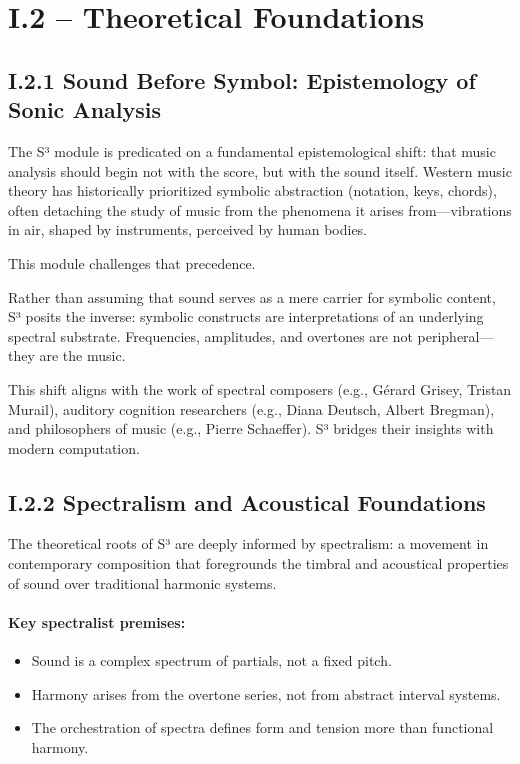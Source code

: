 \section*{I.2 – Theoretical Foundations}

\subsection*{I.2.1 Sound Before Symbol: Epistemology of Sonic Analysis}

The S³ module is predicated on a fundamental epistemological shift: that music analysis should begin not with the score, but with the sound itself. Western music theory has historically prioritized symbolic abstraction (notation, keys, chords), often detaching the study of music from the phenomena it arises from—vibrations in air, shaped by instruments, perceived by human bodies.

This module challenges that precedence.

Rather than assuming that sound serves as a mere carrier for symbolic content, S³ posits the inverse: symbolic constructs are interpretations of an underlying spectral substrate. Frequencies, amplitudes, and overtones are not peripheral—they are the music.

This shift aligns with the work of spectral composers (e.g., Gérard Grisey, Tristan Murail), auditory cognition researchers (e.g., Diana Deutsch, Albert Bregman), and philosophers of music (e.g., Pierre Schaeffer). S³ bridges their insights with modern computation.

\subsection*{I.2.2 Spectralism and Acoustical Foundations}

The theoretical roots of S³ are deeply informed by spectralism: a movement in contemporary composition that foregrounds the timbral and acoustical properties of sound over traditional harmonic systems.

\paragraph{Key spectralist premises:}

\begin{itemize}
    \item Sound is a complex spectrum of partials, not a fixed pitch.
    \item Harmony arises from the overtone series, not from abstract interval systems.
    \item The orchestration of spectra defines form and tension more than functional harmony.
\end{itemize}

